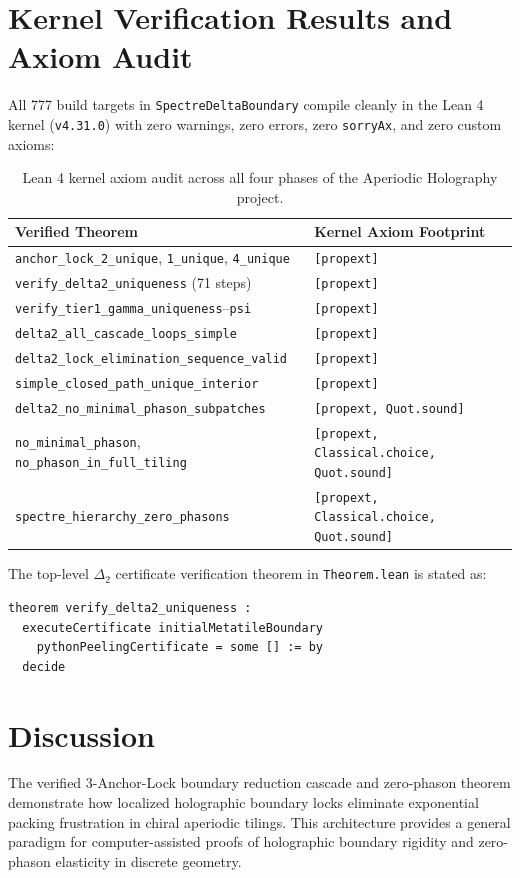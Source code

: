 \documentclass[11pt,a4paper]{article}
\begin{document}
\section{Kernel Verification Results and Axiom Audit}
\label{sec:results}
All 777 build targets in \texttt{SpectreDeltaBoundary} compile cleanly in the Lean 4 kernel (\texttt{v4.31.0}) with zero warnings, zero errors, zero \texttt{sorryAx}, and zero custom axioms:

\begin{table}[ht]
\centering
\small
\begin{tabular}{ll}
\hline
\textbf{Verified Theorem} & \textbf{Kernel Axiom Footprint} \\
\hline
\texttt{anchor\_lock\_2\_unique}, \texttt{1\_unique}, \texttt{4\_unique} & \texttt{[propext]} \\
\texttt{verify\_delta2\_uniqueness} (71 steps) & \texttt{[propext]} \\
\texttt{verify\_tier1\_gamma\_uniqueness}--\texttt{psi} & \texttt{[propext]} \\
\texttt{delta2\_all\_cascade\_loops\_simple} & \texttt{[propext]} \\
\texttt{delta2\_lock\_elimination\_sequence\_valid} & \texttt{[propext]} \\
\texttt{simple\_closed\_path\_unique\_interior} & \texttt{[propext]} \\
\texttt{delta2\_no\_minimal\_phason\_subpatches} & \texttt{[propext, Quot.sound]} \\
\texttt{no\_minimal\_phason}, \texttt{no\_phason\_in\_full\_tiling} & \texttt{[propext, Classical.choice, Quot.sound]} \\
\texttt{spectre\_hierarchy\_zero\_phasons} & \texttt{[propext, Classical.choice, Quot.sound]} \\
\hline
\end{tabular}
\caption{Lean 4 kernel axiom audit across all four phases of the Aperiodic Holography project.}
\label{tab:perf}
\end{table}

The top-level $\Delta_2$ certificate verification theorem in \texttt{Theorem.lean} is stated as:
\begin{verbatim}
theorem verify_delta2_uniqueness :
  executeCertificate initialMetatileBoundary
    pythonPeelingCertificate = some [] := by
  decide
\end{verbatim}

\section{Discussion}
\label{sec:discussion}
The verified 3-Anchor-Lock boundary reduction cascade and zero-phason theorem demonstrate how localized holographic boundary locks eliminate exponential packing frustration in chiral aperiodic tilings. This architecture provides a general paradigm for computer-assisted proofs of holographic boundary rigidity and zero-phason elasticity in discrete geometry.



\end{document}
